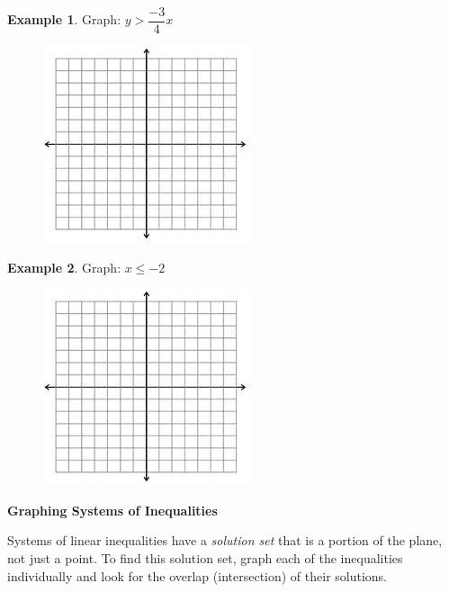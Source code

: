 \documentclass[addpoints,12pt]{exam}
\theoremstyle{definition}
\newtheorem{example}{Example}[subsection]
\begin{document}
\begin{example}
Graph: $y > \dfrac{-3}{4}x$
\begin{figure}[h]
\hfill\includegraphics[scale=1.25]{images/plane}
\end{figure}
\vspace{1in}
\end{example}

\begin{example}
Graph: $x \le -2$
\begin{figure}[h]
\hfill\includegraphics[scale=1.25]{images/plane}
\end{figure}
\vspace{1in}
\end{example}

\newpage

\begin{mdframed}
\textbf{Graphing Systems of Inequalities}

Systems of linear inequalities have a \emph{solution set} that is a portion of the plane, not just a point. To find this solution set, graph each of the inequalities individually and look for the overlap (intersection) of their solutions.
\end{mdframed}
\vspace{.2in}
\end{document}
